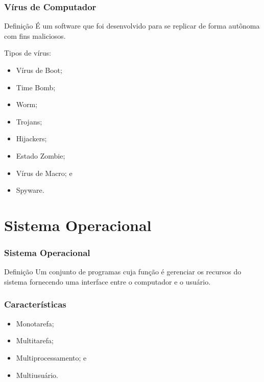 \documentclass[aspectratio=169]{beamer} %
\begin{document}
\begin{frame}
	\frametitle{Vírus de Computador}

	\begin{block}{Defini\c cão}
		É um software que foi desenvolvido para se replicar de forma autônoma com fins maliciosos.
	\end{block}\vfill
		
	Tipos de vírus:
	\begin{itemize}
		\item Vírus de Boot;
		\item Time Bomb;
		\item Worm;
		\item Trojans;
		\item Hijackers;
		\item Estado Zombie;
		\item Vírus de Macro; e
		\item Spyware.
	\end{itemize}
\end{frame}

\section{Sistema Operacional}

\begin{frame}
	\frametitle{Sistema Operacional}
	
	\begin{block}{Defini\c cão}
		Um conjunto de programas cuja função é gerenciar os recursos do sistema fornecendo uma interface entre o computador e o usuário.
	\end{block}
\end{frame}

\begin{frame}
	\frametitle{Características}
		
	\begin{itemize}
		\item Monotarefa;
		\item Multitarefa;
		\item Multiprocessamento; e
		\item Multiusuário.
	\end{itemize}
\end{frame}
\end{document}
